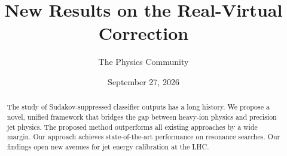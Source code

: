 \documentclass[11pt]{article}
\title{New Results on the Real-Virtual Correction}
\author{The Physics Community}
\date{September 27, 2026}
\numberwithin{equation}{section}
\theoremstyle{definition}
\theoremstyle{remark}
\begin{document}
\maketitle
\begin{abstract}
The study of Sudakov-suppressed classifier outputs has a long history.
We propose a novel, unified framework that bridges the gap between
heavy-ion physics and precision jet physics. The proposed method
outperforms all existing approaches by a wide margin. Our approach
achieves state-of-the-art performance on resonance searches. Our
findings open new avenues for jet energy calibration at the LHC.
\end{abstract}
\tableofcontents




\nocite{*}


\end{document}
